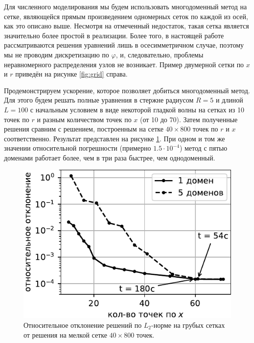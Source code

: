 \documentclass[12pt, a4paper]{report}
\begin{document}
Для численного моделирования мы будем использовать многодоменный метод на сетке, являющейся прямым произведением одномерных сеток по каждой из осей, как это описано выше. Несмотря на отмеченный недостаток, такая сетка является значительно более простой в реализации. Более того, в настоящей работе рассматриваются решения уравнений лишь в осесимметричном случае, поэтому мы не проводим дискретизацию по $\varphi$, и, следовательно, проблемы неравномерного распределения узлов не возникает. Пример двумерной сетки по $x$ и $r$ приведён на рисунке \ref{fig:grid} справа.

Продемонстрируем ускорение, которое позволяет добиться многодоменный метод. Для этого будем решать полные уравнения в стержне радиусом $R=5$ и длиной $L=100$ с начальным условием в виде некоторой гладкой волны на сетках из 10 точек по $r$ и разным количеством точек по $x$ (от 10 до 70). Затем полученные решения сравним с решением, построенным на сетке $40\times 800$ точек по $r$ и $x$ соответственно. Результат представлен на рисунке \ref{fig:error}. При одном и том же значении относительной погрешности (примерно $1.5\cdot 10^{-4}$) метод с пятью доменами работает более, чем в три раза быстрее, чем однодоменный.
\begin{figure}[h!]
	\centering
	\includegraphics[width=0.48\linewidth]{Figures/ErrorBlack}
	\caption{Относительное отклонение решений по $L_2$-норме на грубых сетках от решения на мелкой сетке $40\times 800$ точек.}
	\label{fig:error}
\end{figure}




\end{document}
